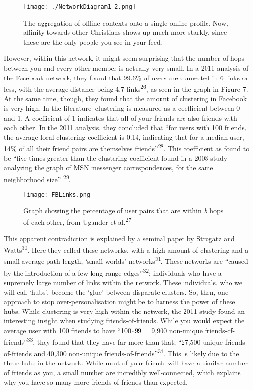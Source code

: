 \documentclass[]{article}
\begin{document}
\begin{figure}
\centering
\texttt{[image: ./NetworkDiagram1\_2.png]}
\caption{The aggregation of offline contexts onto a single online
profile. Now, affinity towards other Christians shows up much more
starkly, since these are the only people you see in your feed.}
\end{figure}

However, within this network, it might seem surprising that the number
of hops between you and every other member is actually very small. In a
2011 analysis of the Facebook network, they found that 99.6\% of users
are connected in 6 links or less, with the average distance being 4.7
links\textsuperscript{26}, as seen in the graph in Figure 7. At the same
time, though, they found that the amount of clustering in Facebook is
very high. In the literature, clustering is measured as a coefficient
between 0 and 1. A coefficient of 1 indicates that all of your friends
are also friends with each other. In the 2011 analysis, they concluded
that ``for users with 100 friends, the average local clustering
coefficient is 0.14, indicating that for a median user, 14\% of all
their friend pairs are themselves friends''\textsuperscript{28}. This
coefficient as found to be ``five times greater than the clustering
coefficient found in a 2008 study analyzing the graph of MSN messenger
correspondences, for the same neighborhood size'' \textsuperscript{29}.

\begin{figure}
\centering
\texttt{[image: FBLinks.png]}
\caption{Graph showing the percentage of user pairs that are within
\emph{h} hops of each other, from Ugander et al.\textsuperscript{27}}
\end{figure}

This apparent contradiction is explained by a seminal paper by Strogatz
and Watts\textsuperscript{30}. Here they called these networks, with a
high amount of clustering and a small average path length,
`small-worlds' networks\textsuperscript{31}. These networks are ``caused
by the introduction of a few long-range edges''\textsuperscript{32};
individuals who have a supremely large number of links within the
network. These individuals, who we will call `hubs', become the `glue'
between disparate clusters. So, then, one approach to stop
over-personalisation might be to harness the power of these hubs. While
clustering is very high within the network, the 2011 study found an
interesting insight when studying friends-of-friends. While you would
expect the average user with 100 friends to have ``100∗99 = 9,900
non-unique friends-of-friends''\textsuperscript{33}, they found that
they have far more than that; ``27,500 unique friends-of-friends and
40,300 non-unique friends-of-friends''\textsuperscript{34}. This is
likely due to the these hubs in the network. While most of your friends
will have a similar number of friends as you, a small number are
incredibly well-connected, which explains why you have so many more
friends-of-friends than expected.
\end{document}
